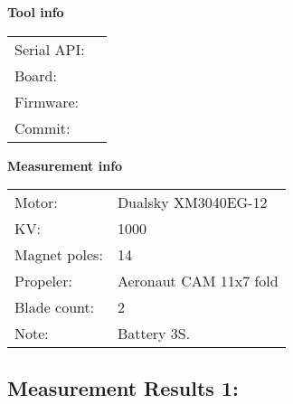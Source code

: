 \documentclass[10pt]{article}
\begin{document}
\noindent
{\large \bf Tool info}
\vspace{3mm}

\noindent
\begin{tabular}{ll}
Serial API:  & \\ 
Board:       & \\ 
Firmware:    & \\ 
Commit:      & 
\end{tabular}
\vspace{3mm}

\noindent
{\large \bf Measurement info}
\vspace{3mm}

\noindent
\begin{tabular}{ll}
Motor:        & Dualsky XM3040EG-12\\ 
KV:           & 1000\\ 
Magnet poles: & 14\\ 
Propeler:     & Aeronaut CAM 11x7 fold\\ 
Blade count:  & 2\\ 
Note:         & Battery 3S.
\end{tabular}

\vspace{3mm}


\subsection*{\large \bf Measurement Results 1:}
\end{document}
